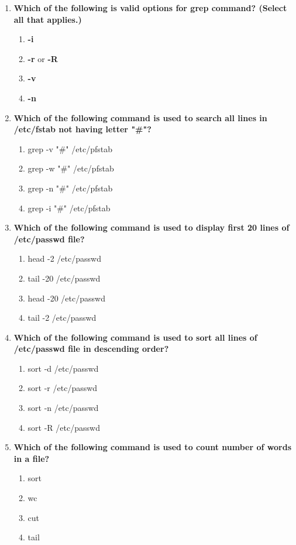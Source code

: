 \begin{flushleft}
\begin{enumerate}
		\item \textbf{Which of the following is valid options for grep command? (Select all that applies.)}
		\begin{enumerate}[label=(\alph*)]
			\item \textbf{-i}   %
  			\item \textbf{-r} or \textbf{-R}   %
			\item \textbf{-v}   %
			\item \textbf{-n}   %
		\end{enumerate}
		\bigskip
		\bigskip
		
		\item \textbf{Which of the following command is used to search all lines in \textbf{/etc/fstab} not having letter \textbf{"\#"}?}
		\begin{enumerate}[label=(\alph*)]
			\item grep -v "\#" /etc/pfstab  %
			\item grep -w "\#" /etc/pfstab  
			\item grep -n "\#" /etc/pfstab  
			\item grep -i "\#" /etc/pfstab  
		\end{enumerate}
		\bigskip
		\bigskip
		
		\item \textbf{Which of the following command is used to display first 20 lines of \textbf{/etc/passwd} file?}
		\begin{enumerate}[label=(\alph*)]
			\item head -2 /etc/passwd
			\item tail -20 /etc/passwd
			\item head -20 /etc/passwd   %
			\item tail -2 /etc/passwd
		\end{enumerate}
	
		\bigskip
		\bigskip
		\item \textbf{Which of the following command is used to sort all lines of \textbf{/etc/passwd} file in descending order?}
		\begin{enumerate}[label=(\alph*)]
			\item sort -d /etc/passwd
			\item sort -r /etc/passwd   %
			\item sort -n /etc/passwd
			\item sort -R /etc/passwd
		\end{enumerate}
	
		\bigskip
		\bigskip
		\newpage
		\item \textbf{Which of the following command is used to count number of words in a file?}
		\begin{enumerate}[label=(\alph*)]
			\item sort
			\item wc   %
			\item cut
			\item tail
		\end{enumerate}
	

\end{enumerate}
\end{flushleft}
